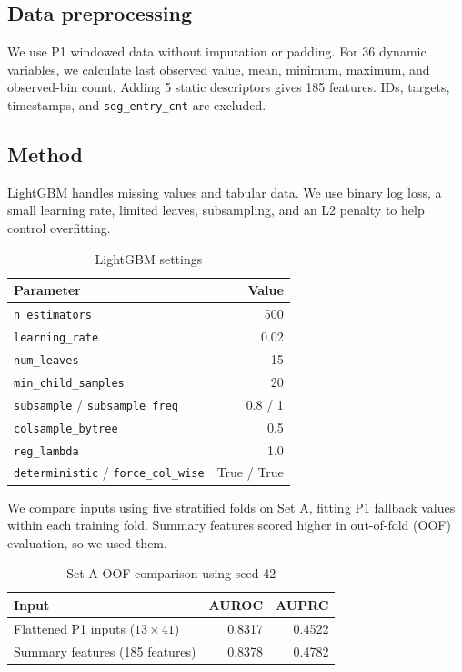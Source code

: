 \documentclass[11pt,a4paper]{article}
\begin{document}
\subsection*{Data preprocessing}
We use P1 windowed data without imputation or padding.
For 36 dynamic variables, we calculate last observed value, mean, minimum, maximum, and observed-bin count.
Adding 5 static descriptors gives 185 features. IDs, targets, timestamps, and \texttt{seg\_entry\_cnt} are excluded.

\subsection*{Method}
LightGBM handles missing values and tabular data. We use binary log loss,
a small learning rate, limited leaves, subsampling, and an L2 penalty to help control overfitting.

\begin{table}[H]
\centering
\caption{LightGBM settings}\label{tab:parameters}
\begin{tabular}{lr}
\toprule
Parameter & Value\\
\midrule
\texttt{n\_estimators} & 500\\
\texttt{learning\_rate} & 0.02\\
\texttt{num\_leaves} & 15\\
\texttt{min\_child\_samples} & 20\\
\texttt{subsample} / \texttt{subsample\_freq} & 0.8 / 1\\
\texttt{colsample\_bytree} & 0.5\\
\texttt{reg\_lambda} & 1.0\\
\texttt{deterministic} / \texttt{force\_col\_wise} & True / True\\
\bottomrule
\end{tabular}
\end{table}

We compare inputs using five stratified folds on Set A, fitting P1 fallback values within each training fold.
Summary features scored higher in out-of-fold (OOF) evaluation, so we used them.

\begin{table}[H]
\centering
\caption{Set A OOF comparison using seed 42}\label{tab:cv}
\begin{tabular}{lrr}
\toprule
Input & AUROC & AUPRC\\
\midrule
Flattened P1 inputs ($13\times41$) & 0.8317 & 0.4522\\
Summary features (185 features) & 0.8378 & 0.4782\\
\bottomrule
\end{tabular}
\end{table}
\end{document}
